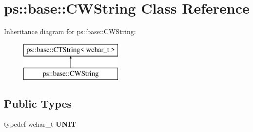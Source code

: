 \hypertarget{classps_1_1base_1_1CWString}{}\section{ps\+:\+:base\+:\+:C\+W\+String Class Reference}
\label{classps_1_1base_1_1CWString}
Inheritance diagram for ps\+:\+:base\+:\+:C\+W\+String\+:\begin{figure}[H]
\begin{center}
\leavevmode
\includegraphics[height=2.000000cm]{classps_1_1base_1_1CWString}
\end{center}
\end{figure}
\subsection*{Public Types}
\begin{DoxyCompactItemize}
\item 
\hypertarget{classps_1_1base_1_1CWString_a7a6d143e2b52a26407e6c561e9a056a5}{}typedef wchar\+\_\+t {\bfseries U\+N\+I\+T}\label{classps_1_1base_1_1CWString_a7a6d143e2b52a26407e6c561e9a056a5}

\end{DoxyCompactItemize}

